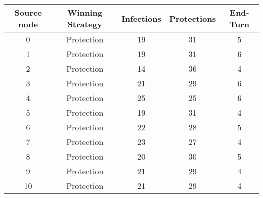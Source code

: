 \documentclass[results.tex]{subfiles}
\begin{document}
    \begin{center}
        \begin{tabular}{| c || c | c | c | c |}
            \hline
            {\bfseries Source node} & {\bfseries Winning Strategy} & {\bfseries Infections} & {\bfseries Protections}
            & {\bfseries End-Turn}
            \\  %
            \hline\hline
            0                       & Protection                   & 19                     & 31                      & 5                    \\
            \hline
            1                       & Protection                   & 19                     & 31                      & 6                    \\
            \hline
            2                       & Protection                   & 14                     & 36                      & 4                    \\
            \hline
            3                       & Protection                   & 21                     & 29                      & 6                    \\
            \hline
            4                       & Protection                   & 25                     & 25                      & 6                    \\
            \hline
            5                       & Protection                   & 19                     & 31                      & 4                    \\
            \hline
            6                       & Protection                   & 22                     & 28                      & 5                    \\
            \hline
            7                       & Protection                   & 23                     & 27                      & 4                    \\
            \hline
            8                       & Protection                   & 20                     & 30                      & 5                    \\
            \hline
            9                       & Protection                   & 21                     & 29                      & 4                    \\
            \hline
            10                      & Protection                   & 21                     & 29                      & 4                    \\

\end{tabular}
\end{center}
\end{document}

